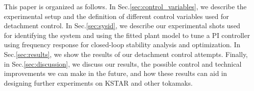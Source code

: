 This paper is organized as follows.
In Sec.\ref{sec:control_variables}, we describe the experimental setup and the definition of different control variables used for detachment control.
In Sec.\ref{sec:sysid}, we describe our experimental shots used for identifying the system and using the fitted plant model to tune a PI controller using frequency response for closed-loop stability analysis and optimization.
In Sec.\ref{sec:results}, we show the results of our detachment control attempts.
Finally, in Sec.\ref{sec:discussion}, we discuss our results, the possible control and technical improvements we can make in the future, and how these results can aid in designing further experiments on KSTAR and other tokamaks.